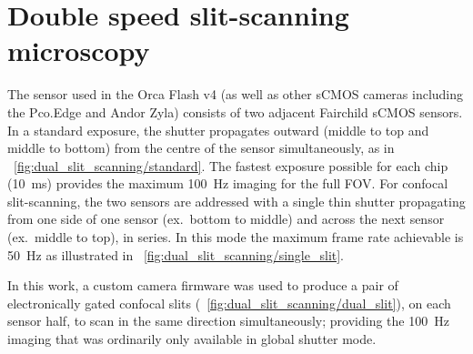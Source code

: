 \section{Double speed \gls{slit-scanning} microscopy}
The sensor used in the Orca Flash v4 (as well as other \gls{sCMOS} cameras including the Pco.Edge and Andor Zyla) consists of two adjacent Fairchild \gls{sCMOS} sensors.
In a standard exposure, the shutter propagates outward (middle to top and middle to bottom) from the centre of the sensor simultaneously, as in \figurename~\ref{fig:dual_slit_scanning/standard}.
The fastest exposure possible for each chip (\SI{10}{\milli\second}) provides the maximum \SI{100}{\hertz} imaging for the full \gls{FOV}.
For confocal \gls{slit-scanning}, the two sensors are addressed with a single thin shutter propagating from one side of one sensor (ex.~bottom to middle) and across the next sensor (ex.~middle to top), in series.
In this mode the maximum frame rate achievable is \SI{50}{\hertz} as illustrated in \figurename~\ref{fig:dual_slit_scanning/single_slit}.

In this work, a custom camera firmware was used to produce a pair of electronically gated confocal slits (\figurename~\ref{fig:dual_slit_scanning/dual_slit}), on each sensor half, to scan in the same direction simultaneously; providing the \SI{100}{\hertz} imaging that was ordinarily only available in global shutter mode.


